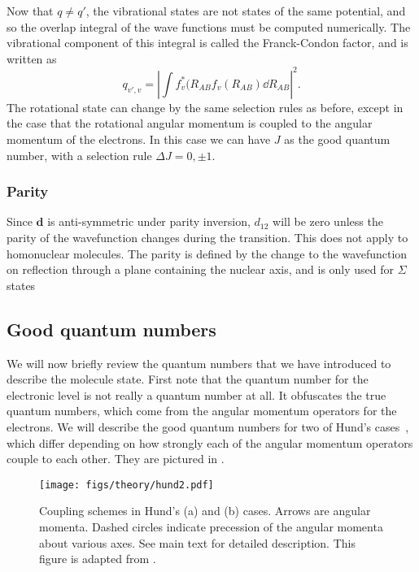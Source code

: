 Now that $q\neq q'$, the vibrational states are not states of the same
potential, and so the overlap integral of the wave functions must
be computed numerically. The vibrational component of this integral is called
the Franck-Condon factor, and is written as
%
\begin{equation}
  q_{v',v} = \left|\int f^*_v(R_{AB}f_v(R_{AB})\dd R_{AB}\right|^2.
\end{equation}
%
The rotational state can change by the same selection rules as before, except
in the case that the rotational angular momentum is coupled to the angular
momentum of the electrons. In this case we can have $J$ as the good quantum
number, with a selection rule $\Delta J = 0, \pm1$.

\subsubsection{Parity}

Since $\mathbf{d}$ is anti-symmetric under parity inversion, $d_{12}$ will be
zero unless the parity of the wavefunction changes during the transition. This
does not apply to homonuclear molecules. The parity is defined by the change to
the wavefunction on reflection through a plane containing the nuclear axis, and
is only used for $\Sigma$ states

\subsection{Good quantum numbers}
\label{theory:qnos}

We will now briefly review the quantum numbers that we have introduced to
describe the molecule state. First note that the quantum number for the
electronic level is not really a quantum number at all. It obfuscates the true
quantum numbers, which come from the angular momentum operators for the
electrons. We will describe the good quantum numbers for two of Hund's
cases~\cite{brown_carrington_2003}, which differ depending on how strongly each
of the angular momentum operators couple to each other. They are pictured in
.

\begin{figure}
  \centering
  \texttt{[image: figs/theory/hund2.pdf]}
  \caption{Coupling schemes in Hund's (a) and (b) cases. Arrows are angular
    momenta. Dashed circles indicate precession of the angular momenta about
    various axes. See main text for detailed description. This figure is
    adapted from .
  }
  \label{theory:fig:hund}
\end{figure}


